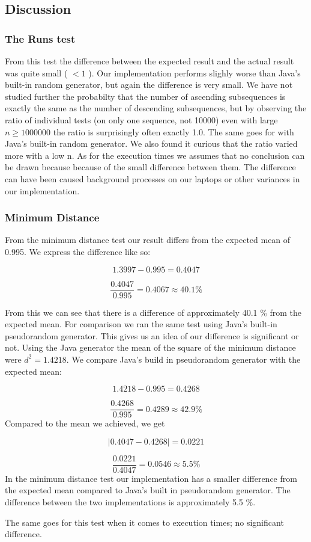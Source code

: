 \subsection{Discussion}
\subsubsection{The Runs test}
From this test the difference between the expected result and the actual result was quite small ( $< 1$ \textperthousand). Our implementation performs slighly worse than Java's built-in random generator, but again the difference is very small. We have not studied further the probabilty that the number of ascending subsequences is exactly the same as the number of descending subsequences, but by observing the ratio of individual tests (on only one sequence, not 10000) even with large $n \ge 1000000$ the ratio is surprisingly often exactly 1.0. The same goes for with Java's built-in random generator. We also found it curious that the ratio varied more with a low n. As for the execution times we assumes that no conclusion can be drawn because because of the small difference between them. The difference can have been caused background processes on our laptops or other variances in our implementation.

\subsubsection{Minimum Distance}
From the minimum distance test our result differs from the expected mean of 0.995. We express the difference like so:

\[1.3997 - 0.995 = 0.4047\] 

\[\frac{0.4047}{0.995} = 0.4067 \approx 40.1 \%\]

From this we can see that there is a difference of approximately 40.1 \% from the expected mean. For comparison we ran the same test using Java's built-in pseudorandom generator. This gives us an idea of our difference is significant or not. Using the Java generator the mean of the square of the minimum distance were $d^2= 1.4218$. We compare Java's build in pseudorandom generator with the expected mean:

\[1.4218 - 0.995 = 0.4268\]

\[\frac{0.4268}{0.995} = 0.4289 \approx 42.9 \%\]
Compared to the mean we achieved, we get

\[|0.4047 - 0.4268| = 0.0221\]

\[\frac{0.0221}{0.4047} = 0.0546 \approx 5.5 \%\] 
In the minimum distance test our implementation has a smaller difference from the expected mean compared to Java's built in pseudorandom generator. The difference between the two implementations is approximately 5.5 \%. 

The same goes for this test when it comes to execution times; no significant difference.